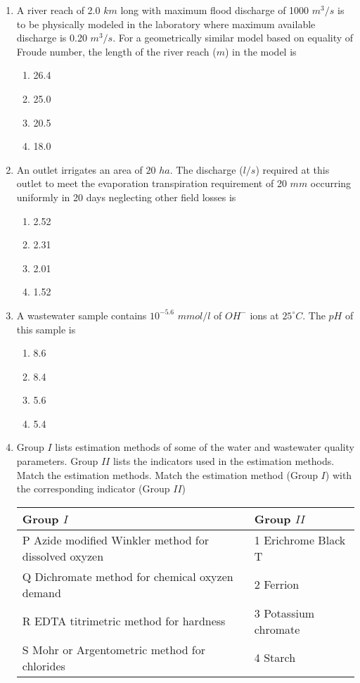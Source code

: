\documentclass[journal]{IEEEtran}
\begin{document}
\begin{enumerate}
	\item A river reach of 2.0 $km$ long with maximum flood discharge of 1000 $m^3/s$ is to be physically modeled in the laboratory where maximum available discharge is 0.20 $m^3/s$. For 
a geometrically similar model based on equality of Froude number, the length of the river reach ($m$) in the model is
\begin{multicols}{2}
	\begin{enumerate}
		\item 26.4
		\item 25.0
		\item 20.5
		\item 18.0
	\end{enumerate}
\end{multicols}
	\item An outlet irrigates an area of $20$ $ha$. The discharge ($l/s$) required at this outlet to meet the evaporation transpiration requirement of 20 $mm$ occurring uniformly in 20 days neglecting other field losses is
		\begin{multicols}{2}
	\begin{enumerate}
		\item 2.52
		\item 2.31
		\item 2.01
		\item 1.52
	\end{enumerate}
\end{multicols}
	\item A wastewater sample contains $10^{-5.6}$ $mmol/l$ of $OH^{-}$ ions at $25 ^{\circ}C$. The $pH$ of this sample is
		\begin{multicols}{2}
	\begin{enumerate}
		\item 8.6
		\item 8.4
		\item 5.6
		\item 5.4
	\end{enumerate}
\end{multicols}
	\item Group $I$ lists estimation methods of some of the water and wastewater quality parameters. Group $II$ lists the indicators used in the estimation methods. Match the estimation
		methods. Match the estimation method (Group $I$) with the corresponding indicator (Group $II$)\\
\begin{center}
		
\begin{tabular}{ |l| l|}
\hline
Group $I$ &  Group $II$ \\ 
\hline
P Azide modified Winkler method for dissolved oxyzen & 1 Erichrome Black T \\
\hline
Q Dichromate method for chemical oxyzen demand & 2 Ferrion \\
\hline
R EDTA titrimetric method for hardness & 3 Potassium chromate  \\
\hline
S Mohr or Argentometric method for chlorides &  4 Starch \\
\hline



\end{tabular}
\end{center}
\end{enumerate}
\end{document}
